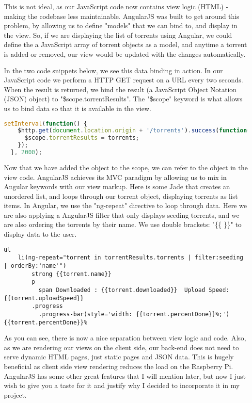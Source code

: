 This is not ideal, as our JavaScript code now contains view logic (HTML) - making the codebase less maintainable. AngularJS was built to get around this problem, by allowing us to define "models" that we can bind to, and display in the view. So, if we are displaying the list of torrents using Angular, we could define the a JavaScript array of torrent objects as a model, and anytime a torrent is added or removed, our view would be updated with the changes automatically. 

In the two code snippets below, we see this data binding in action. In our JavaScript code we perform a HTTP GET request on a URL every two seconds. When the result is returned, we bind the result (a JavaScript Object Notation (JSON) object) to "\$scope.torrentResults". The "\$scope" keyword is what allows us to bind data so that it is available in the view.

\vspace{20px}
\begin{lstlisting}[caption=AngularJS binding data with \$scope keyword, language=JavaScript]
  setInterval(function() {
    $http.get(document.location.origin + '/torrents').success(function(torrents) {
      $scope.torrentResults = torrents;
    });
  }, 2000);
\end{lstlisting}


Now that we have added the object to the scope, we can refer to the object in the view code. AngularJS achieves its MVC paradigm by allowing us to mix in Angular keywords with our view markup. Here is some Jade that creates an unordered list, and loops through our torrent object, displaying torrents as list items. In Angular, we use the "ng-repeat" directive to loop through data. Here we are also applying a AngularJS filter that only displays seeding torrents, and we are also ordering the torrents by their name. We use double brackets: "\{\{ \}\}" to display data to the user.

\vspace{20px}
\begin{lstlisting}[caption=Jade with AngularJS]
 ul
 	li(ng-repeat="torrent in torrentResults.torrents | filter:seeding | orderBy:'name'")
    	strong {{torrent.name}}
        p
          span Downloaded : {{torrent.downloaded}}  Upload Speed: {{torrent.uploadSpeed}}
        .progress
          .progress-bar(style='width: {{torrent.percentDone}}%;') {{torrent.percentDone}}%
\end{lstlisting}


As you can see, there is now a nice separation between view logic and code. Also, as we are rendering our views on the client side, our back-end does not need to serve dynamic HTML pages, just static pages and JSON data. This is hugely beneficial as client side view rendering reduces the load on the Raspberry Pi. AngularJS has some other great features that I will mention later, but now I just wish to give you a taste for it and justify why I decided to incorporate it in my project.


